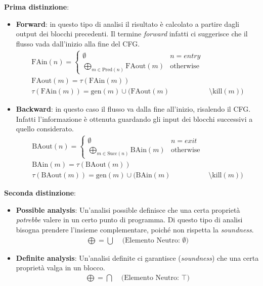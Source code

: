 \documentclass[a4paper,12pt,openany]{article}
\begin{document}
    \textbf{Prima distinzione}:
    \begin{itemize}
        \item \textbf{Forward}: in questo tipo di analisi il risultato è calcolato a partire dagli output dei blocchi precedenti. Il termine \emph{forward} infatti ci suggerisce che il flusso vada dall'inizio alla fine del CFG.
        \begin{align*}
            \mbox{FAin}(n) = 
            \begin{cases}
                \emptyset & n=entry\\
                \bigoplus\limits_{m\in \mbox{Pred}(n)} \mbox{FAout}(m) & \mbox{otherwise}
            \end{cases}&\\[1em]
            \mbox{FAout}(m) = \tau(\mbox{FAin}(m))&\\
            \tau(\mbox{FAin}(m)) = \mbox{gen}(m) \cup (\mbox{FAout}(m) &\setminus \mbox{kill}(m))
        \end{align*}
        \item \textbf{Backward}: in questo caso il flusso va dalla fine all'inizio, risalendo il CFG. Infatti l'informazione è ottenuta guardando gli input dei blocchi successivi a quello considerato.
        \begin{align*}
            \mbox{BAout}(n) =
            \begin{cases}
                \emptyset & n=exit\\
                \bigoplus\limits_{m\in \mbox{Succ}(n)} \mbox{BAin}(m) & \mbox{otherwise}
            \end{cases}&\\[1em]
            \mbox{BAin}(m) = \tau(\mbox{BAout}(m))&\\
            \tau(\mbox{BAout}(m)) = \mbox{gen}(m) \cup (\mbox{BAin}(m) &\setminus \mbox{kill}(m))
        \end{align*}
    \end{itemize}

    \textbf{Seconda distinzione}:
    \begin{itemize}
        \item \textbf{Possible analysis}: Un'analisi possible definisce che una certa proprietà \emph{potrebbe} valere in un certo punto di programma. Di questo tipo di analisi bisogna prendere l'insieme complementare, poiché non rispetta la \emph{soundness}.\\
        \begin{align*}
            \bigoplus = \bigcup \;\;\;\;\text{(Elemento Neutro: $\emptyset$)}
        \end{align*}
        \item \textbf{Definite analysis}: Un'analisi definite ci garantisce (\emph{soundness}) che una certa proprietà valga in un blocco. 
        \begin{align*}
            \bigoplus = \bigcap \;\;\;\;\text{(Elemento Neutro: $\top$)}
        \end{align*}
    \end{itemize}
\end{document}
